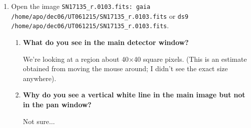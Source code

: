 \documentclass[12pt]{article}
\begin{document}
\begin{enumerate}[1.]
    \item Open the image \texttt{SN17135_r.0103.fits:
        gaia /home/apo/dec06/UT061215/SN17135_r.0103.fits} or
        \texttt{ds9 /home/apo/dec06/UT061215/SN17135_r.0103.fits}.
        \begin{enumerate}[1.]
            \item \textbf{What do you see in the main detector window?}

                We're looking at a region about 40$\times$40 square pixels.
                (This is an estimate obtained from moving the mouse around;
                I didn't see the exact size anywhere).

            \item \textbf{Why do you see a vertical white line in the
                          main image but not in the pan window?}

                    Not sure$\ldots$

        \end{enumerate}

\end{enumerate}
\end{document}
